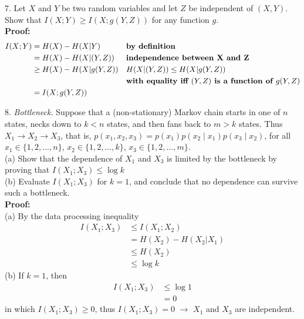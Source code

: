 \documentclass[12pt]{article}
\begin{document}
	\par 
	7. Let $X$ and $Y$ be two random variables and let $Z$ be independent of $(X,Y)$. Show that $I(X;Y)\geq I(X;g(Y,Z))$ for any function $g$. \\
	\textbf{Proof:} 
	\begin{align*}
		I(X;Y) &= H(X) - H(X{\mid}Y) && \text{\textbf{by definition}}\\
			   &= H(X) - H(X{\mid}(Y,Z)) && \text{\textbf{independence between X and Z}}\\
			   &\geq H(X) - H(X{\mid}g(Y,Z)) && \text{\textbf{$H(X{\mid}(Y,Z))\leq H(X{\mid}g(Y,Z))$}} \\
			   & &&\text{\textbf{with equality iff $(Y,Z)$ is a function of $g(Y,Z)$}} \\
			   &= I(X;g(Y,Z)) \\
	\end{align*}
	
	\par 
	8. \textit{Bottleneck.} Suppose that a (non-stationary) Markov chain starts in one of $n$ states, necks down to $k<n$ states, and then fans back to $m>k$ states. Thus $X_1\rightarrow X_2\rightarrow X_3$, that is, $p(x_1,x_2,x_3) = p(x_1)p(x_2{\mid}x_1)p(x_3{\mid}x_2)$, for all $x_1\in\{1,2,...,n\}$, $x_2\in\{1,2,...,k\}$, $x_3\in\{1,2,...,m\}$. \\
	(a) Show that the dependence of $X_1$ and $X_3$ is limited by the bottleneck by proving that $I(X_1;X_3)\leq \log k$ \\
	(b) Evaluate $I(X_1;X_3)$ for $k=1$, and conclude that no dependence can survive such a bottleneck.\\
	\textbf{Proof:}\\
	(a) By the data processing inequality
	\begin{align*}
		I(X_1;X_3) &\leq I(X_1;X_2) \\
				   &= H(X_2) - H(X_2|X_1) \\
				   &\leq H(X_2) \\
				   &\leq \log k
	\end{align*}
	(b) If $k = 1$, then
	\begin{align*}
		I(X_1;X_3) &\leq \log1 \\
		           &= 0
	\end{align*}
	in which $I(X_1;X_3)\geq0$, thus $I(X_1;X_3) = 0$ $\rightarrow$ $X_1$ and $X_3$ are independent.
\end{document}
